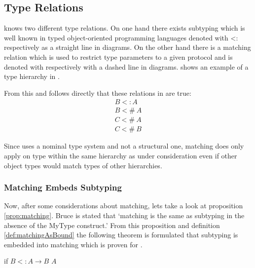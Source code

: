 \subsection{Type Relations}
\ooplss knows two different type relations. On one hand there exists
subtyping which is well known in typed object-oriented programming
languages denoted with <: respectively as a straight line in diagrams. On
the other hand there is a matching relation which is used to restrict type
parameters to a given protocol and is denoted with \match respectively
with a dashed line in diagrams.  shows an example
of a type hierarchy in \ooplss.

From this and  follows directly that these
relations in  are true:
\begin{align}
B <: A \\
B <\!\!\#~A \label{alg:match} \\
C <\!\!\#~A \\
C <\!\!\#~B
\end{align}



Since \ooplss uses a nominal type system and not a structural one,
matching does only apply on type within the same hierarchy as under
consideration even if other object types would match types of other
hierarchies.

\subsubsection{Matching Embeds Subtyping}
Now, after some considerations about matching, lets take a look at
proposition \ref{prop:matching}. Bruce is stated that `matching is
the same as subtyping in the absence of the MyType construct.' From
this proposition and definition \ref{def:matchingAsBound} the following
theorem is formulated that subtyping is embedded into matching which is
proven for \ooplss.

\begin{prop}
	\label{prop:matchinIsSubtyping}
	if $B <: A \rightarrow B$ \match $A$
\end{prop}

